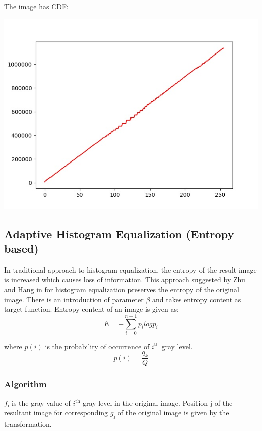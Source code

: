\documentclass[12pt, a4paper, font = Times New Roman]{article}
\begin{document}
The image has CDF:
\begin{center}
\includegraphics[scale = 0.4]{CDF_2.jpg}
\label{CDF_2}
\end{center}

\clearpage
\newpage

\subsection{Adaptive Histogram Equalization (Entropy based)}
\par
In traditional approach to histogram equalization, the entropy of the result image is increased which causes loss of information. This approach suggested by Zhu and Hang in \cite{zhu_huang_2012} for histogram equalization preserves the entropy of the original image. There is an introduction of parameter $\beta$ and takes entropy content as target function.
Entropy content of an image is given as:
\begin{equation}
E = -\sum_{i=0}^{n-1}{p_ilogp_i}
\end{equation}

where $p(i)$ is the probability of occurrence of $i^{\text{th}}$ gray level.
\begin{equation}
p(i) = \frac{q_k}{Q}
\end{equation}

\subsubsection{Algorithm}
\par
$f_{\text{i}}$ is the gray value of $i^{\text{th}}$ gray level in the original image. Position j of the resultant image for corresponding $g_{\text{j}}$ of the original image is given by the transformation.
\end{document}
